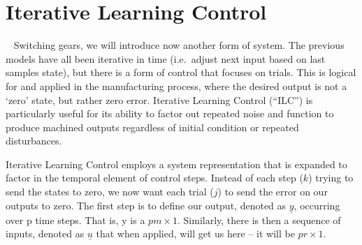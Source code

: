 \FloatBarrier\section{Iterative Learning Control} %
~\label{sec:ILC}
Switching gears, we will introduce now another form of system. The previous models have all been iterative in time (i.e.\ adjust next input based on last samples state), but there is a form of control that focuses on trials. This is logical for and applied in the manufacturing process, where the desired output is not a `zero' state, but rather zero error. Iterative Learning Control (``ILC'') is particularly useful for its ability to factor out repeated noise and function to produce machined outputs regardless of initial condition or repeated disturbances.

Iterative Learning Control employs a system representation that is expanded to factor in the temporal element of control steps. Instead of each step ($k$) trying to send the states to zero, we now want each trial ($j$) to send the error on our outputs to zero. 
The first step is to define our output, denoted as $\underline{y}$, occurring over p time steps. That is, y is a $pm\times 1$. Similarly, there is then a sequence of inputs, denoted as $\underline{u}$ that when applied, will get us here -- it will be $pr\times 1$. 

